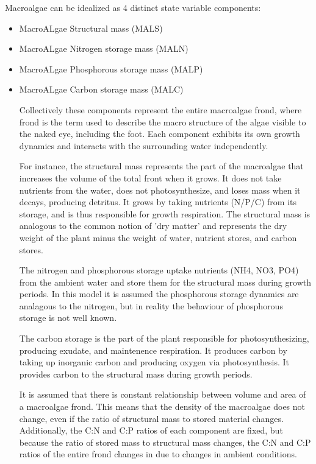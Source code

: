 \documentclass{article}
\begin{document}
Macroalgae can be idealized as 4 distinct state variable components:
\begin{itemize}
\item MacroALgae Structural mass (MALS)
\item MacroALgae Nitrogen storage mass (MALN)
\item MacroALgae Phosphorous storage mass (MALP)
\item MacroALgae Carbon storage mass (MALC)

Collectively these components represent the entire macroalgae frond, where frond is the term used to describe the macro structure of the algae visible to the naked eye, including the foot. Each component exhibits its own growth dynamics and interacts with the surrounding water independently. 

For instance, the structural mass represents the part of the macroalgae that increases the volume of the total front when it grows. It does not take nutrients from the water, does not photosynthesize, and loses mass when it decays, producing detritus. It grows by taking nutrients (N/P/C) from its storage, and is thus responsible for growth respiration. The structural mass is analogous to the common notion of 'dry matter' and represents the dry weight of the plant minus the weight of water, nutrient stores, and carbon stores.
 
The nitrogen and phosphorous storage uptake nutrients (NH4, NO3, PO4) from the ambient water and store them for the structural mass during growth periods. In this model it is assumed the phosphorous storage dynamics are analagous to the nitrogen, but in reality the behaviour of phosphorous storage is not well known.

The carbon storage is the part of the plant responsible for photosynthesizing, producing exudate, and maintenence respiration. It produces carbon by taking up inorganic carbon and producing oxygen via photosynthesis. It provides carbon to the structural mass during growth periods. 

It is assumed that there is constant relationship between volume and area of a macroalgae frond. This means that the density of the macroalgae does not change, even if the ratio of structural mass to stored material changes. Additionally, the C:N and C:P ratios of each component are fixed, but because the ratio of stored mass to structural mass changes, the C:N and C:P ratios of the entire frond changes in due to changes in ambient conditions.

\end{itemize}
\end{document}
